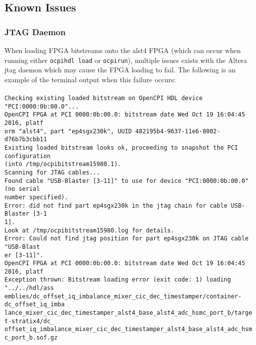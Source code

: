 \documentclass{article}
\newcommand{\terminaloutput}[1]{\texttt{#1}}
\begin{document}
\subsection*{Known Issues}
\subsubsection*{JTAG Daemon}
When loading FPGA bitstreams onto the alst4 FPGA (which can occur when running either \terminaloutput{ocpihdl load} or \terminaloutput{ocpirun}), multiple issues exists with the Altera jtag daemon which may cause the FPGA loading to fail. The following is an example of the terminal output when this failure occurs: \\ \\
\noindent\terminaloutput{Checking existing loaded bitstream on OpenCPI HDL device "PCI:0000:0b:00.0"... \\
OpenCPI FPGA at PCI 0000:0b:00.0: bitstream date Wed Oct 19 16:04:45 2016, platf \\
orm "alst4", part "ep4sgx230k", UUID 482195b4-9637-11e6-8002-d76b7b3cbb11 \\
Existing loaded bitstream looks ok, proceeding to snapshot the PCI configuration \\
 (into /tmp/ocpibitstream15980.1). \\
Scanning for JTAG cables... \\
Found cable "USB-Blaster [3-11]" to use for device "PCI:0000:0b:00.0" (no serial \\
number specified). \\
Error: did not find part ep4sgx230k in the jtag chain for cable USB-Blaster [3-1 \\
1]. \\
Look at /tmp/ocpibitstream15980.log for details. \\
Error: Could not find jtag position for part ep4sgx230k on JTAG cable "USB-Blast \\
er [3-11]". \\
OpenCPI FPGA at PCI 0000:0b:00.0: bitstream date Wed Oct 19 16:04:45 2016, platf \\
Exception thrown: Bitstream loading error (exit code: 1) loading "../../hdl/ass \\
emblies/dc\_offset\_iq\_imbalance\_mixer\_cic\_dec\_timestamper/container-dc\_offset\_iq\_imba \\
lance\_mixer\_cic\_dec\_timestamper\_alst4\_base\_alst4\_adc\_hsmc\_port\_b/target-stratix4/dc\_ \\
offset\_iq\_imbalance\_mixer\_cic\_dec\_timestamper\_alst4\_base\_alst4\_adc\_hsmc\_port\_b.sof.gz \\
}
\end{document}

